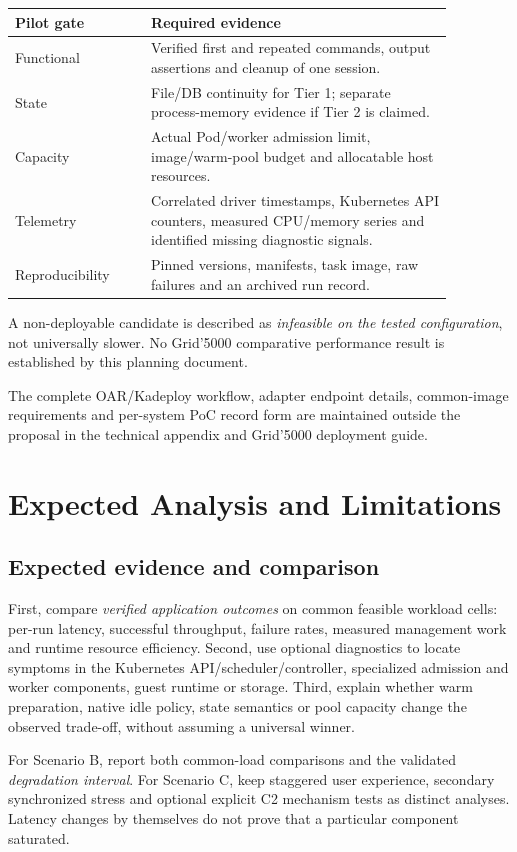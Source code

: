 \documentclass[
  a4paper,
]{article}
\begin{document}
{\small
\begin{longtable}{@{}p{0.27\linewidth}p{0.60\linewidth}@{}}
\toprule
Pilot gate & Required evidence\\
\midrule
\endhead
\bottomrule
\endlastfoot
Functional &
Verified first and repeated
commands, output assertions
and cleanup of one session.\\
State &
File/DB continuity for
Tier 1; separate
process-memory evidence
if Tier 2 is claimed.\\
Capacity &
Actual Pod/worker admission
limit, image/warm-pool
budget and allocatable
host resources.\\
Telemetry &
Correlated driver timestamps,
Kubernetes API counters,
measured CPU/memory series
and identified missing
diagnostic signals.\\
Reproducibility &
Pinned versions, manifests,
task image, raw failures
and an archived run record.\\
\end{longtable}
}

A non-deployable candidate
is described as
\emph{infeasible on the
tested configuration},
not universally slower.
No Grid'5000 comparative
performance result is
established by this
planning document.

The complete OAR/Kadeploy
workflow, adapter endpoint
details, common-image
requirements and per-system
PoC record form are maintained
outside the proposal in
the technical appendix and
Grid'5000 deployment guide.

\section{Expected Analysis and Limitations}
\label{sec:analysis}
\subsection{Expected evidence and comparison}
First, compare \emph{verified
application outcomes} on
common feasible workload
cells: per-run latency,
successful throughput,
failure rates, measured
management work and
runtime resource efficiency.
Second, use optional
diagnostics to locate
symptoms in the Kubernetes
API/scheduler/controller,
specialized admission and
worker components,
guest runtime or storage.
Third, explain whether
warm preparation, native
idle policy, state semantics
or pool capacity change
the observed trade-off,
without assuming a
universal winner.

For Scenario B, report
both common-load comparisons
and the validated
\emph{degradation interval}.
For Scenario C, keep
staggered user experience,
secondary synchronized
stress and optional
explicit C2 mechanism
tests as distinct analyses.
Latency changes by
themselves do not prove
that a particular
component saturated.
\end{document}
